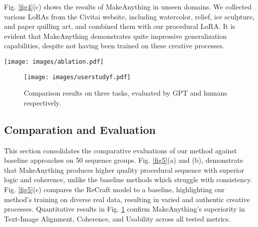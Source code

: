 
Fig. \ref{fig4}(c) shows the results of MakeAnything in unseen domains. We collected various LoRAs from the Civitai \cite{civitai2025} website, including watercolor, relief, ice sculpture, and paper quilling art, and combined them with our procedural LoRA. It is evident that MakeAnything demonstrates quite impressive generalization capabilities, despite not having been trained on these creative processes.


\begin{figure*}[htp]
    \centering
    \texttt{[image: images/ablation.pdf]} %
    \vspace{-4mm}
    \caption{Ablation study results.}
    \vspace{-4mm}
    \label{fig6}
\end{figure*}

\begin{figure}[htp]
    \centering
    \texttt{[image: images/userstudyf.pdf]} %
    \caption{Comparison results on three tasks, evaluated by GPT and humans respectively.}
    \vspace{-2mm}
    \label{fig7}
\end{figure}


\subsection{Comparation and  Evaluation} 
This section consolidates the comparative evaluations of our method against baseline approaches on 50 sequence groups. Fig. \ref{fig5}(a) and (b), demonstrate that MakeAnything produces higher quality procedural sequence with superior logic and coherence, unlike the baseline methods which struggle with consistency. Fig. \ref{fig5}(c) compares the ReCraft model to a baseline, highlighting our method's training on diverse real data, resulting in varied and authentic creative processes. Quantitative results in  Fig. \ref{fig7} confirm MakeAnything's superiority in Text-Image Alignment, Coherence, and Usability across all tested metrics.


